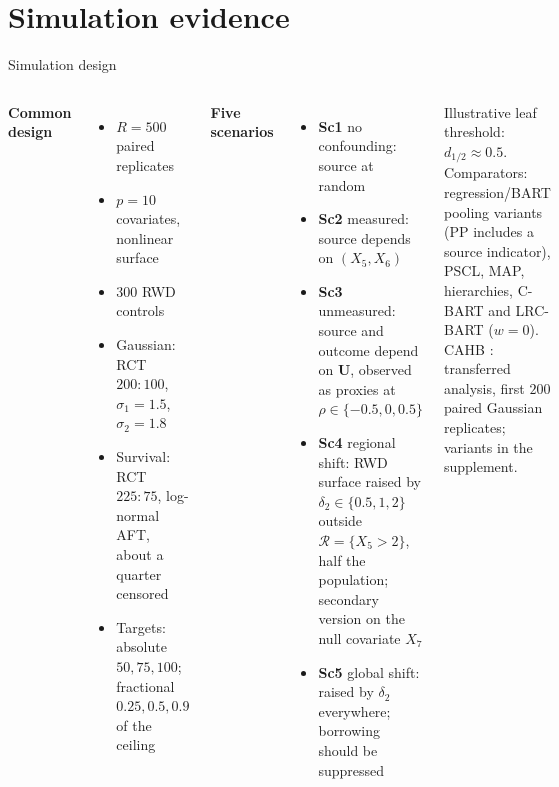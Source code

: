 \documentclass[11pt,aspectratio=169]{beamer}
\begin{document}
\section{Simulation evidence}
\begin{frame}{Simulation design}
  \footnotesize
  \begin{columns}[T,onlytextwidth]
      \textbf{Common design}
      \begin{itemize}\setlength\itemsep{1pt}
        \item $R=500$ paired replicates
        \item $p=10$ covariates, nonlinear surface
        \item $300$ RWD controls
        \item Gaussian: RCT $200{:}100$, $\sigma_1=1.5$, $\sigma_2=1.8$
        \item Survival: RCT $225{:}75$, log-normal AFT, about a quarter censored
        \item Targets: absolute $50,75,100$; fractional $0.25,0.5,0.9$ of the ceiling
      \end{itemize}
      \textbf{Five scenarios}
      \begin{itemize}\setlength\itemsep{1pt}
        \item \textbf{Sc1} no confounding: source at random
        \item \textbf{Sc2} measured: source depends on $(X_5,X_6)$
        \item \textbf{Sc3} unmeasured: source and outcome depend on $\bm U$, observed as proxies at $\rho\in\{-0.5,0,0.5\}$
        \item \textbf{Sc4} regional shift: RWD surface raised by $\delta_2\in\{0.5,1,2\}$ outside $\mathcal R=\{X_5>2\}$, half the population; secondary version on the null covariate $X_7$
        \item \textbf{Sc5} global shift: raised by $\delta_2$ everywhere; borrowing should be suppressed
      \end{itemize}
      \vspace{0.2em}
      {\scriptsize Illustrative leaf threshold: $d_{1/2}\approx0.5$. Comparators: regression/BART pooling variants (PP includes a source indicator), PSCL, MAP, hierarchies, C-BART and LRC-BART ($w=0$). CAHB \citep{Jin2023CAHB}: transferred analysis, first $200$ paired Gaussian replicates; variants in the supplement.}
  \end{columns}
\end{frame}
\end{document}

